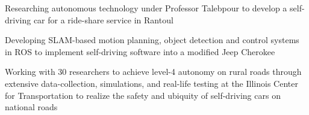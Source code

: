 \begin{cvitemize}
\item Researching autonomous technology under Professor Talebpour to develop a self-driving car for a ride-share service in Rantoul
\item Developing SLAM-based motion planning, object detection and control systems in ROS to implement self-driving software into a modified Jeep Cherokee
\item Working with 30 researchers to achieve level-4 autonomy on rural roads through extensive data-collection, simulations, and real-life testing at the Illinois Center for Transportation to realize the safety and ubiquity of self-driving cars on national roads
\end{cvitemize}
